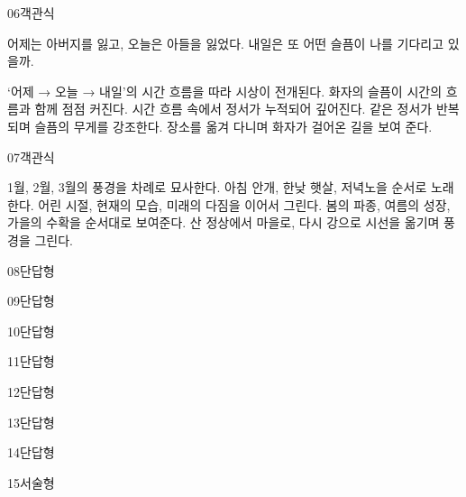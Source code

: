 \documentclass[fs9,seriesRus]{korfarm-base}
\begin{document}
\begin{kfQBlock}{06}{객관식}
\begin{kfEvidence}어제는 아버지를 잃고, 오늘은 아들을 잃었다. 내일은 또 어떤 슬픔이 나를 기다리고 있을까.\end{kfEvidence}
\begin{kfChoices}
\kfChoice ‘어제 → 오늘 → 내일’의 시간 흐름을 따라 시상이 전개된다.
\kfChoice 화자의 슬픔이 시간의 흐름과 함께 점점 커진다.
\kfChoice 시간 흐름 속에서 정서가 누적되어 깊어진다.
\kfChoice 같은 정서가 반복되며 슬픔의 무게를 강조한다.
\kfChoice 장소를 옮겨 다니며 화자가 걸어온 길을 보여 준다.
\end{kfChoices}
\end{kfQBlock}
\begin{kfQBlock}{07}{객관식}
\begin{kfChoices}
\kfChoice 1월, 2월, 3월의 풍경을 차례로 묘사한다.
\kfChoice 아침 안개, 한낮 햇살, 저녁노을 순서로 노래한다.
\kfChoice 어린 시절, 현재의 모습, 미래의 다짐을 이어서 그린다.
\kfChoice 봄의 파종, 여름의 성장, 가을의 수확을 순서대로 보여준다.
\kfChoice 산 정상에서 마을로, 다시 강으로 시선을 옮기며 풍경을 그린다.
\end{kfChoices}
\end{kfQBlock}
\begin{kfQBlock}{08}{단답형}
\end{kfQBlock}
\begin{kfQBlock}{09}{단답형}
\end{kfQBlock}
\begin{kfQBlock}{10}{단답형}
\end{kfQBlock}
\begin{kfQBlock}{11}{단답형}
\end{kfQBlock}
\begin{kfQBlock}{12}{단답형}
\end{kfQBlock}
\begin{kfQBlock}{13}{단답형}
\end{kfQBlock}
\begin{kfQBlock}{14}{단답형}
\end{kfQBlock}
\begin{kfQBlock}{15}{서술형}
\end{kfQBlock}
\kfEndMC
\end{document}
